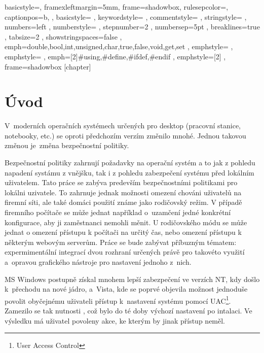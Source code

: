 \renewcommand*\lstlistingname{Výpis}
\setlength{\parskip}{3pt plus 1pt minus 1pt}
\lstset
{
    basicstyle=\footnotesize,
    framexleftmargin=5mm,
    frame=shadowbox,
    rulesepcolor=\color{blue},
    captionpos=b,
, basicstyle=\footnotesize\ttfamily
, keywordstyle=\color{blue}
, commentstyle=\color{OliveGreen}
, stringstyle=\color{Maroon}
, numbers=left
, numberstyle=\scriptsize
, stepnumber=2
, numbersep=5pt
, breaklines=true
, tabsize=2
, showstringspaces=false
, emph={double,bool,int,unsigned,char,true,false,void,get,set}
, emphstyle=\color{blue}
, emphstyle=\color{red}
, emph={[2]\#using,\#define,\#ifdef,\#endif}
, emphstyle={[2]\color{blue}}
, frame=shadowbox
}
[chapter]
\newcommand{\cppc}[1]{\lstinline[language=C++]$#1$}

\chapter{Úvod}
V~moderních operačních systémech určených pro desktop (pracovní stanice, notebooky, etc.) se oproti předchozím verzím změnilo mnohé. Jednou takovou změnou je~změna bezpečnostní politiky.

Bezpečnostní politiky zahrnují požadavky na operační systém a to jak z pohledu napadení systámu z vnějšku, tak i z pohledu zabezpečení systému před lokálním uživatelem. Tato práce se zabýva predevším bezpečnostními politikami pro lokálni uzivatele. To zahrnuje jednak možnosti omezení chováni uživatelů na firemní síti, ale také domáci použití známe jako rodičovský režim.
V případě firemního počítače se může jednat například o~uzamčení jedné konkrétní konfigurace, aby ji zaměstnanci nemohli měnit. U rodičovského módu se může jednat o omezení přístupu k počítači na určitý čas, nebo omezení přístupu k některým webovým serverům. Práce se bude zabývat příbuzným tématem: expermimentální integrací dvou rozhraní určených právě pro takovéto využití a~opravou grafického nástroje pro nastavení jednoho z~nich.

MS Windows postupně získal mnohem lepší zabezpečení ve verzích NT, kdy došlo k~přechodu na nové jádro, a~Vista, kde se poprvé objevila možnost jednoduše povolit obyčejnému uživateli přístup k~nastavení systému pomocí UAC\footnote{User Access Control}. Zamezilo se tak nutnosti , což bylo do té doby výchozí nastavení po intalaci. Ve výsledku má uživatel povoleny akce, ke kterým by jinak přístup neměl.

